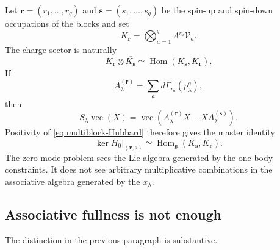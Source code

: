 \documentclass[11pt]{article}
\numberwithin{equation}{section}
\newcommand{\cV}{\mathcal V}
\newcommand{\fg}{\mathfrak g}
\newcommand{\Hom}{\operatorname{Hom}}
\newcommand{\vecop}{\operatorname{vec}}
\begin{document}
Let $\mathbf r=(r_1,\ldots,r_q)$ and $\mathbf s=(s_1,\ldots,s_q)$ be the spin-up and spin-down occupations of the blocks and set
\begin{equation}
 K_{\mathbf r}
 =
 \bigotimes_{a=1}^q\Lambda^{r_a}\cV_a.
 \label{eq:K-r}
\end{equation}
The charge sector is naturally
\begin{equation}
 K_{\mathbf r}\otimes\overline{K_{\mathbf s}}
 \simeq
 \Hom(K_{\mathbf s},K_{\mathbf r}).
 \label{eq:charge-vectorization}
\end{equation}
If
\begin{equation}
 A_\lambda^{(\mathbf r)}
 =
 \sum_a d\Gamma_{r_a}(p_\lambda^a),
 \label{eq:A-lambda-r}
\end{equation}
then
\begin{equation}
 S_\lambda\vecop(X)
 =
 \vecop\!\left(
 A_\lambda^{(\mathbf r)}X
 -
 XA_\lambda^{(\mathbf s)}
 \right).
 \label{eq:block-vectorization}
\end{equation}
Positivity of \eqref{eq:multiblock-Hubbard} therefore gives the master identity
\begin{equation}
 \boxed{
 \ker H_0\big|_{(\mathbf r,\mathbf s)}
 \simeq
 \Hom_{\fg}(K_{\mathbf s},K_{\mathbf r}).}
 \label{eq:master-kernel}
\end{equation}
The zero-mode problem sees the Lie algebra generated by the one-body constraints.  It does not see arbitrary multiplicative combinations in the associative algebra generated by the $x_\lambda$.

\subsection{Associative fullness is not enough}

The distinction in the previous paragraph is substantive.
\end{document}
